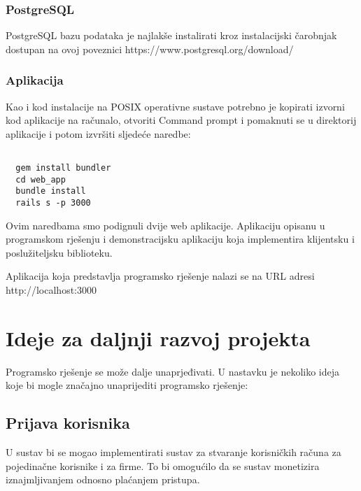 \documentclass[times, utf8, zavrsni]{fer}
\begin{document}
\subsection{PostgreSQL}
PostgreSQL bazu podataka je najlakše instalirati kroz instalacijski čarobnjak
dostupan na ovoj poveznici https://www.postgresql.org/download/

\subsection{Aplikacija}
Kao i kod instalacije na POSIX operativne sustave potrebno je kopirati izvorni
kod aplikacije na računalo, otvoriti Command prompt i pomaknuti se u direktorij
aplikacije i potom izvršiti sljedeće naredbe:

\begin{lstlisting}

  gem install bundler
  cd web_app
  bundle install
  rails s -p 3000

\end{lstlisting}

Ovim naredbama smo podignuli dvije web aplikacije. Aplikaciju opisanu u
programskom rješenju i demonstracijsku aplikaciju koja implementira klijentsku
i poslužiteljsku biblioteku.

Aplikacija koja predstavlja programsko rješenje nalazi se na URL adresi
http://localhost:3000

\chapter{Ideje za daljnji razvoj projekta}
Programsko rješenje se može dalje unaprjeđivati. U nastavku je nekoliko ideja
koje bi mogle značajno unaprijediti programsko rješenje:

\section{Prijava korisnika}
U sustav bi se mogao implementirati sustav za stvaranje korisničkih računa za
pojedinačne korisnike i za firme. To bi omogućilo da se sustav monetizira
iznajmljivanjem odnosno plaćanjem pristupa.
\end{document}
